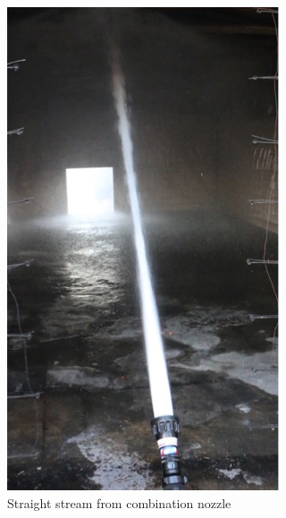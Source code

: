 \documentclass[12pt,oneside]{book}
\begin{document}
\begin{figure}[!ht]
\begin{subfigure}[b]{0.45\columnwidth}
		\includegraphics[width=0.75\columnwidth]{../Figures/Pictures/SS_70}
		\caption{Straight stream from combination nozzle}
	\end{subfigure}
	\begin{subfigure}[b]{0.45\columnwidth}
		\centering

\end{subfigure}
\end{figure}
\end{document}
